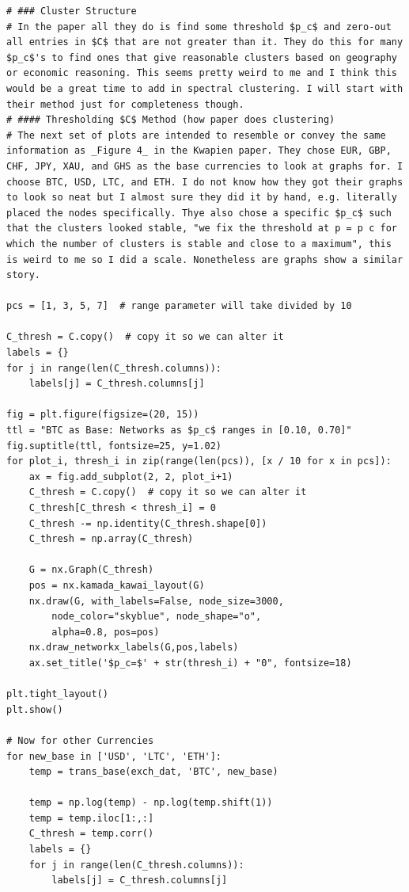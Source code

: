 \documentclass[a4paper]{article}
\begin{document}
\begin{lstlisting}
# ### Cluster Structure
# In the paper all they do is find some threshold $p_c$ and zero-out all entries in $C$ that are not greater than it. They do this for many $p_c$'s to find ones that give reasonable clusters based on geography or economic reasoning. This seems pretty weird to me and I think this would be a great time to add in spectral clustering. I will start with their method just for completeness though.
# #### Thresholding $C$ Method (how paper does clustering)
# The next set of plots are intended to resemble or convey the same information as _Figure 4_ in the Kwapien paper. They chose EUR, GBP, CHF, JPY, XAU, and GHS as the base currencies to look at graphs for. I choose BTC, USD, LTC, and ETH. I do not know how they got their graphs to look so neat but I almost sure they did it by hand, e.g. literally placed the nodes specifically. Thye also chose a specific $p_c$ such that the clusters looked stable, "we fix the threshold at p = p c for which the number of clusters is stable and close to a maximum", this is weird to me so I did a scale. Nonetheless are graphs show a similar story.

pcs = [1, 3, 5, 7]  # range parameter will take divided by 10

C_thresh = C.copy()  # copy it so we can alter it
labels = {}
for j in range(len(C_thresh.columns)):
    labels[j] = C_thresh.columns[j]

fig = plt.figure(figsize=(20, 15))
ttl = "BTC as Base: Networks as $p_c$ ranges in [0.10, 0.70]"
fig.suptitle(ttl, fontsize=25, y=1.02)
for plot_i, thresh_i in zip(range(len(pcs)), [x / 10 for x in pcs]):
    ax = fig.add_subplot(2, 2, plot_i+1)
    C_thresh = C.copy()  # copy it so we can alter it
    C_thresh[C_thresh < thresh_i] = 0
    C_thresh -= np.identity(C_thresh.shape[0])
    C_thresh = np.array(C_thresh)
    
    G = nx.Graph(C_thresh)
    pos = nx.kamada_kawai_layout(G)
    nx.draw(G, with_labels=False, node_size=3000, 
        node_color="skyblue", node_shape="o", 
        alpha=0.8, pos=pos)
    nx.draw_networkx_labels(G,pos,labels)
    ax.set_title('$p_c=$' + str(thresh_i) + "0", fontsize=18)
        
plt.tight_layout()
plt.show()

# Now for other Currencies
for new_base in ['USD', 'LTC', 'ETH']:
    temp = trans_base(exch_dat, 'BTC', new_base)

    temp = np.log(temp) - np.log(temp.shift(1))
    temp = temp.iloc[1:,:]
    C_thresh = temp.corr()
    labels = {}
    for j in range(len(C_thresh.columns)):
        labels[j] = C_thresh.columns[j]


\end{lstlisting}
\end{document}
